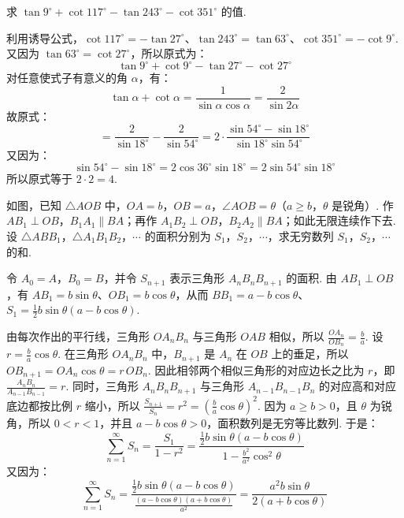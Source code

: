 \begin{problem}

求 \(\tan 9^\circ+\cot 117^\circ-\tan 243^\circ-\cot 351^\circ\) 的值.
\end{problem}

\begin{solution}
利用诱导公式，\(\cot117^\circ=-\tan27^\circ\)、\(\tan243^\circ=\tan63^\circ\)、\(\cot351^\circ=-\cot9^\circ\).
又因为 \(\tan63^\circ=\cot27^\circ\)，所以原式为：
\[
 \tan9^\circ+\cot9^\circ-\tan27^\circ-\cot27^\circ
\]
对任意使式子有意义的角 \(\alpha\)，有：
\[
 \tan\alpha+\cot\alpha=\frac{1}{\sin\alpha\cos\alpha}=\frac{2}{\sin2\alpha}
\]
故原式：
\[
 =\frac{2}{\sin18^\circ}-\frac{2}{\sin54^\circ}
 =2\cdot\frac{\sin54^\circ-\sin18^\circ}{\sin18^\circ\sin54^\circ}
\]
又因为：
\[
 \sin54^\circ-\sin18^\circ=2\cos36^\circ\sin18^\circ=2\sin54^\circ\sin18^\circ
\]
所以原式等于 \(2\cdot2=4\).
\end{solution}

\begin{problem}

如图，已知 \(\triangle AOB\) 中，\(OA=b\)，\(OB=a\)，\(\angle AOB=\theta\)（\(a\geqslant b\)，\(\theta\) 是锐角）. 作 \(AB_1\perp OB\)，\(B_1A_1\parallel BA\)；再作 \(A_1B_2\perp OB\)，\(B_2A_2\parallel BA\)；如此无限连续作下去. 设 \(\triangle ABB_1\)，\(\triangle A_1B_1B_2\)，\(\cdots\) 的面积分别为 \(S_1\)，\(S_2\)，\(\cdots\)，求无穷数列 \(S_1\)，\(S_2\)，\(\cdots\) 的和.

\end{problem}

\begin{solution}
令 \(A_0=A\)，\(B_0=B\)，并令 \(S_{n+1}\) 表示三角形 \(A_nB_nB_{n+1}\) 的面积. 由 \(AB_1\perp OB\)，有 \(AB_1=b\sin\theta\)、\(OB_1=b\cos\theta\)，从而 \(BB_1=a-b\cos\theta\)、\(S_1=\frac12b\sin\theta\left(a-b\cos\theta\right)\).

由每次作出的平行线，三角形 \(OA_nB_n\) 与三角形 \(OAB\) 相似，所以 \(\frac{OA_n}{OB_n}=\frac{b}{a}\). 设 \(r=\frac{b}{a}\cos\theta\).
在三角形 \(OA_nB_n\) 中，\(B_{n+1}\) 是 \(A_n\) 在 \(OB\) 上的垂足，所以 \(OB_{n+1}=OA_n\cos\theta=r\,OB_n\).
因此相邻两个相似三角形的对应边长之比为 \(r\)，即 \(\frac{A_nB_n}{A_{n-1}B_{n-1}}=r\).
同时，三角形 \(A_nB_nB_{n+1}\) 与三角形 \(A_{n-1}B_{n-1}B_n\) 的对应高和对应底边都按比例 \(r\) 缩小，所以 \(\frac{S_{n+1}}{S_n}=r^2=\left(\frac{b}{a}\cos\theta\right)^2\).
因为 \(a\geqslant b>0\)，且 \(\theta\) 为锐角，所以 \(0<r<1\)，并且 \(a-b\cos\theta>0\)，面积数列是无穷等比数列. 于是：
\[
\sum_{n=1}^{\infty}S_n=\frac{S_1}{1-r^2}
=\frac{\frac12b\sin\theta\left(a-b\cos\theta\right)}{1-\frac{b^2}{a^2}\cos^2\theta}
\]
又因为：
\[
\sum_{n=1}^{\infty}S_n
=\frac{\frac12b\sin\theta\left(a-b\cos\theta\right)}{\frac{\left(a-b\cos\theta\right)\left(a+b\cos\theta\right)}{a^2}}
=\frac{a^2b\sin\theta}{2\left(a+b\cos\theta\right)}
\]
\end{solution}
